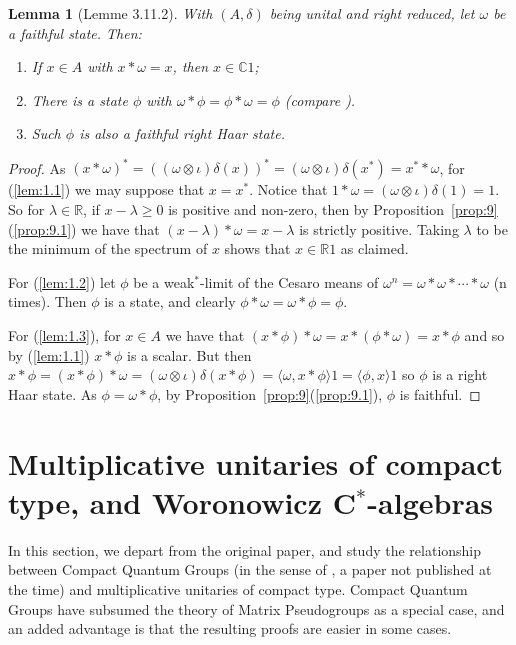 \documentclass[a4paper,12pt]{article}
\theoremstyle{plain}
\newtheorem{lemma}[proposition]{Lemma}
\theoremstyle{definition}
\newcommand{\ip}[2]{{\langle {#1} , {#2} \rangle}}
\begin{document}
\begin{lemma}[Lemme 3.11.2]\label{lem:1}
With $(A,\delta)$ being unital and right reduced, let $\omega$ be a faithful
state.  Then:
\begin{enumerate}
\item\label{lem:1.1} If $x\in A$ with $x*\omega=x$, then $x\in\mathbb C1$;
\item\label{lem:1.2} There is a state $\phi$ with $\omega*\phi=\phi*\omega
=\phi$ (compare \cite{r54}).
\item\label{lem:1.3} Such $\phi$ is also a faithful right Haar state.
\end{enumerate}
\end{lemma}
\begin{proof}
As $(x*\omega)^* = ((\omega\otimes\iota)\delta(x))^* =
(\omega\otimes\iota)\delta(x^*) = x^* * \omega$, for (\ref{lem:1.1})
we may suppose that $x=x^*$.  Notice that $1*\omega =
(\omega\otimes\iota)\delta(1) = 1$.  So for $\lambda\in\mathbb R$,
if $x-\lambda\geq0$ is positive and non-zero, then by
Proposition~\ref{prop:9}(\ref{prop:9.1}) we have that
$(x-\lambda)*\omega = x-\lambda$ is strictly positive.  Taking $\lambda$ to
be the minimum of the spectrum of $x$ shows that $x\in\mathbb R1$ as claimed.

For (\ref{lem:1.2}) let $\phi$ be a weak$^*$-limit of the Cesaro means of
$\omega^n = \omega*\omega*\cdots*\omega$ (n times).  Then $\phi$ is a state,
and clearly $\phi*\omega = \omega*\phi = \phi$.

For (\ref{lem:1.3}), for $x\in A$ we have that $(x*\phi)*\omega = x*(\phi
*\omega) = x*\phi$ and so by (\ref{lem:1.1}) $x*\phi$ is a scalar.  But then
$x*\phi = (x*\phi)*\omega = (\omega\otimes\iota)\delta(x*\phi)
= \ip{\omega}{x*\phi}1 = \ip{\phi}{x}1$ so $\phi$ is a right Haar state.
As $\phi = \omega*\phi$, by Proposition~\ref{prop:9}(\ref{prop:9.1}),
$\phi$ is faithful.
\end{proof}




\section{Multiplicative unitaries of compact type, and Woronowicz
C$^*$-algebras}

In this section, we depart from the original paper, and study the relationship
between Compact Quantum Groups (in the sense of \cite{woro}, a paper not
published at the time) and multiplicative unitaries of compact type.
Compact Quantum Groups have subsumed the theory of Matrix Pseudogroups as
a special case, and an added advantage is that the resulting proofs are
easier in some cases.
\end{document}
